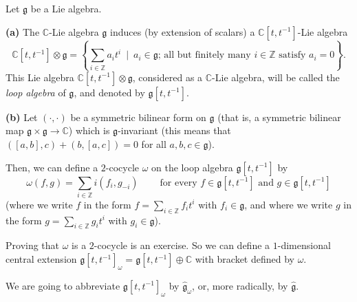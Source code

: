 \documentclass[etingof-lie.tex]{subfiles}
\begin{document}
\begin{definition}
\label{def.loop}Let $\mathfrak{g}$ be a Lie algebra.

\textbf{(a)} The $\mathbb{C}$-Lie algebra $\mathfrak{g}$ induces (by extension
of scalars) a $\mathbb{C}\left[  t,t^{-1}\right]  $-Lie algebra%
\[
\mathbb{C}\left[  t,t^{-1}\right]  \otimes\mathfrak{g}=\left\{  \sum
\limits_{i\in\mathbb{Z}}a_{i}t^{i}\ \mid\ a_{i}\in\mathfrak{g}\text{; all but
finitely many }i\in\mathbb{Z}\text{ satisfy }a_{i}=0\right\}  .
\]
This Lie algebra $\mathbb{C}\left[  t,t^{-1}\right]  \otimes\mathfrak{g}$,
considered as a $\mathbb{C}$-Lie algebra, will be called the \textit{loop
algebra} of $\mathfrak{g}$, and denoted by $\mathfrak{g}\left[  t,t^{-1}%
\right]  $.

\textbf{(b)} Let $\left(  \cdot,\cdot\right)  $ be a symmetric bilinear form
on $\mathfrak{g}$ (that is, a symmetric bilinear map $\mathfrak{g}%
\times\mathfrak{g}\rightarrow\mathbb{C}$) which is $\mathfrak{g}$-invariant
(this means that $\left(  \left[  a,b\right]  ,c\right)  +\left(  b,\left[
a,c\right]  \right)  =0$ for all $a,b,c\in\mathfrak{g}$).

Then, we can define a $2$-cocycle $\omega$ on the loop algebra $\mathfrak{g}%
\left[  t,t^{-1}\right]  $ by%
\begin{equation}
\omega\left(  f,g\right)  =\sum\limits_{i\in\mathbb{Z}}i\left(  f_{i}%
,g_{-i}\right)  \ \ \ \ \ \ \ \ \ \ \text{for every }f\in\mathfrak{g}\left[
t,t^{-1}\right]  \text{ and }g\in\mathfrak{g}\left[  t,t^{-1}\right]
\label{loop.w}%
\end{equation}
(where we write $f$ in the form $f=\sum\limits_{i\in\mathbb{Z}}f_{i}t^{i}$
with $f_{i}\in\mathfrak{g}$, and where we write $g$ in the form $g=\sum
\limits_{i\in\mathbb{Z}}g_{i}t^{i}$ with $g_{i}\in\mathfrak{g}$).

Proving that $\omega$ is a $2$-cocycle is an exercise. So we can define a
$1$-dimensional central extension $\mathfrak{g}\left[  t,t^{-1}\right]
_{\omega}=\mathfrak{g}\left[  t,t^{-1}\right]  \oplus\mathbb{C}$ with bracket
defined by $\omega$.

We are going to abbreviate $\mathfrak{g}\left[  t,t^{-1}\right]  _{\omega}$ by
$\widehat{\mathfrak{g}}_{\omega}$, or, more radically, by
$\widehat{\mathfrak{g}}$.
\end{definition}
\end{document}
